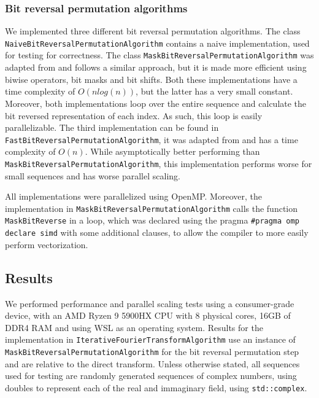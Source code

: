\subsubsection{Bit reversal permutation algorithms}
We implemented three different bit reversal permutation algorithms. The class \texttt{Naive\-Bit\-Reversal\-Permutation\-Algorithm} contains a naive implementation, used for testing for correctness. The class \texttt{Mask\-Bit\-Reversal\-Permutation\-Algorithm} was adapted from \cite{mask_bit_rev} and follows a similar approach, but it is made more efficient using biwise operators, bit masks and bit shifts. Both these implementations have a time complexity of $O(n log(n))$, but the latter has a very small constant. Moreover, both implementations loop over the entire sequence and calculate the bit reversed representation of each index. As such, this loop is easily parallelizable. The third implementation can be found in \texttt{Fast\-Bit\-Reversal\-Permutation\-Algorithm}, it was adapted from \cite{fast_bit_rev} and has a time complexity of $O(n)$. While asymptotically better performing than \texttt{Mask\-Bit\-Reversal\-Permutation\-Algorithm}, this implementation performs worse for small sequences and has worse parallel scaling. 

All implementations were parallelized using OpenMP. Moreover, the implementation in \texttt{Mask\-Bit\-Reversal\-Permutation\-Algorithm} calls the function \texttt{Mask\-Bit\-Reverse} in a loop, which was declared using the pragma \texttt{\#pragma omp declare simd} with some additional clauses, to allow the compiler to more easily perform vectorization.

\subsection{Results}
We performed performance and parallel scaling tests using a consumer-grade device, with an AMD Ryzen 9 5900HX CPU with 8 physical cores, 16GB of DDR4 RAM and using WSL as an operating system. Results for the implementation in \texttt{Iterative\-Fourier\-Transform\-Algorithm} use an instance of \texttt{Mask\-Bit\-Reversal\-Permutation\-Algorithm} for the bit reversal permutation step and are relative to the direct transform. Unless otherwise stated, all sequences used for testing are randomly generated sequences of complex numbers, using doubles to represent each of the real and immaginary field, using \texttt{std::complex}. 

